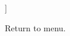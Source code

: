 \documentclass{article}
\begin{document}
\begin{description}
\begin{enumerate}
									
								\end{enumerate}
							
							]
								
									Return to menu.
								
							
						
						\end{description}
					
				
			
			
		
		 
		
		
	
\end{document}
